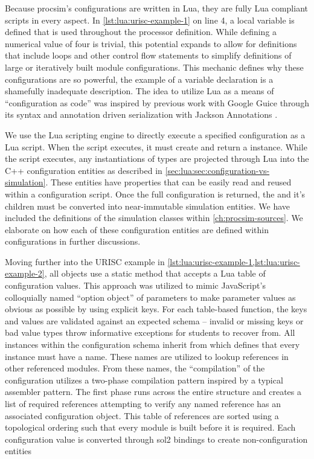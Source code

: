 Because procsim's configurations are written in Lua, they are fully Lua compliant scripts in every aspect. In \cref{lst:lua:urisc-example-1} on line 4, a local variable is defined that is used throughout the processor definition. While defining a numerical value of four is trivial, this potential expands to allow for definitions that include loops and other control flow statements to simplify definitions of large or iteratively built module configurations. This mechanic defines why these configurations are so powerful, the example of a variable declaration is a shamefully inadequate description. The idea to utilize Lua as a means of ``configuration as code'' was inspired by previous work with Google Guice through its  syntax \cite{Google:Guice:Motiviation} and annotation driven serialization with Jackson Annotations \cite{GitHub:Jackson:Annotations}.

We use the Lua scripting engine to directly execute a specified configuration as a Lua script. When the script executes, it must create and return a  instance. While the script executes, any instantiations of types are projected through Lua into the C++ configuration entities as described in \cref{sec:lua:sec:configuration-vs-simulation}. These entities have properties that can be easily read and reused within a configuration script. Once the full configuration is returned, the  and it's children must be converted into near-immutable simulation entities. We have included the definitions of the simulation classes within \cref{ch:procsim-sources}. We elaborate on how each of these configuration entities are defined within configurations in further discussions.

Moving further into the URISC example in \cref{lst:lua:urisc-example-1,lst:lua:urisc-example-2}, all objects use a static  method that accepts a Lua table of configuration values. This approach was utilized to mimic JavaScript's colloquially named ``option object'' of parameters to make parameter values as obvious as possible by using explicit keys. For each table-based function, the keys and values are validated against an expected schema -- invalid or missing keys or bad value types throw informative exceptions for students to recover from. All instances within the configuration schema inherit from  which defines that every instance must have a name. These names are utilized to lookup references in other referenced modules. From these names, the ``compilation'' of the configuration utilizes a two-phase compilation pattern inspired by a typical assembler pattern. The first phase runs across the entire structure and creates a list of required references attempting to verify any named reference has an associated configuration object. This table of references are sorted using a topological ordering such that every module is built before it is required. Each configuration value is converted through sol2 bindings to create non-configuration entities 

